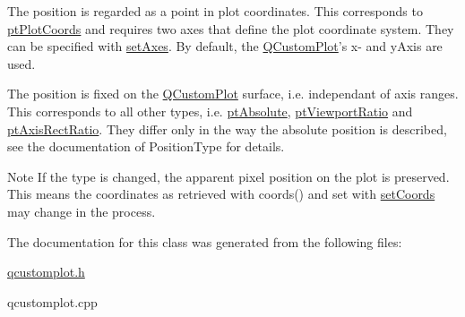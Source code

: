 \begin{DoxyItemize}
\item The position is regarded as a point in plot coordinates. This corresponds to \hyperlink{classQCPItemPosition_aad9936c22bf43e3d358552f6e86dbdc8ad5ffb8dc99ad73263f7010c77342294c}{pt\-Plot\-Coords} and requires two axes that define the plot coordinate system. They can be specified with \hyperlink{classQCPItemPosition_a2185f45c75ac8cb9be89daeaaad50e37}{set\-Axes}. By default, the \hyperlink{classQCustomPlot}{Q\-Custom\-Plot}'s x-\/ and y\-Axis are used.\end{DoxyItemize}
\begin{DoxyItemize}
\item The position is fixed on the \hyperlink{classQCustomPlot}{Q\-Custom\-Plot} surface, i.\-e. independant of axis ranges. This corresponds to all other types, i.\-e. \hyperlink{classQCPItemPosition_aad9936c22bf43e3d358552f6e86dbdc8a564f5e53e550ead1ec5fc7fc7d0b73e0}{pt\-Absolute}, \hyperlink{classQCPItemPosition_aad9936c22bf43e3d358552f6e86dbdc8ac7d6aa89ceacb39658b0d6da061c789a}{pt\-Viewport\-Ratio} and \hyperlink{classQCPItemPosition_aad9936c22bf43e3d358552f6e86dbdc8a01080fd00eaf09fa238ef6b73bbfef75}{pt\-Axis\-Rect\-Ratio}. They differ only in the way the absolute position is described, see the documentation of Position\-Type for details.\end{DoxyItemize}
\begin{DoxyNote}{Note}
If the type is changed, the apparent pixel position on the plot is preserved. This means the coordinates as retrieved with coords() and set with \hyperlink{classQCPItemPosition_aa988ba4e87ab684c9021017dcaba945f}{set\-Coords} may change in the process. 
\end{DoxyNote}


The documentation for this class was generated from the following files\-:\begin{DoxyCompactItemize}
\item 
\hyperlink{qcustomplot_8h}{qcustomplot.\-h}\item 
qcustomplot.\-cpp\end{DoxyCompactItemize}
